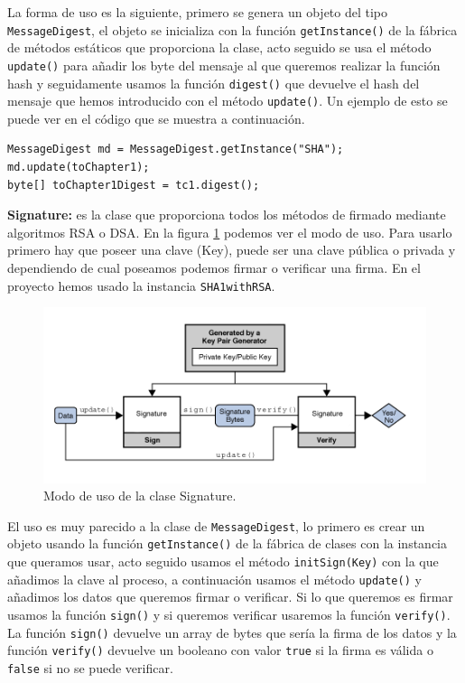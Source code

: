 La forma de uso es la siguiente, primero se genera un objeto del tipo \lstinline{MessageDigest}, el objeto se inicializa con la función \lstinline{getInstance()} de la fábrica de métodos estáticos que proporciona la clase, acto seguido se usa el método \lstinline{update()} para añadir los byte del mensaje al que queremos realizar la función hash y seguidamente usamos la función \lstinline{digest()} que devuelve el hash del mensaje que hemos introducido con el método \lstinline{update()}. Un ejemplo de esto se puede ver en el código que se muestra a continuación.

\begin{lstlisting}[style=Java] 
MessageDigest md = MessageDigest.getInstance("SHA");
md.update(toChapter1);
byte[] toChapter1Digest = tc1.digest();
\end{lstlisting}

\textbf{Signature:} es la clase que proporciona todos los métodos de firmado mediante algoritmos RSA o DSA. En la figura \ref{fig:signature} podemos ver el modo de uso. Para usarlo primero hay que poseer una clave (Key), puede ser una clave pública o privada y dependiendo de cual poseamos podemos firmar o verificar una firma. En el proyecto hemos usado la instancia \lstinline{SHA1withRSA}.

\begin{figure}[h]
  \centering
    \includegraphics[scale=0.8]{./Criptografia/imagenes/signature.png}
  \caption{Modo de uso de la clase Signature.}
  \label{fig:signature}
\end{figure} 

El uso es muy parecido a la clase de \lstinline{MessageDigest}, lo primero es crear un objeto usando la función \lstinline{getInstance()} de la fábrica de clases con la instancia que queramos usar, acto seguido usamos el método \lstinline{initSign(Key)} con la que añadimos la clave al proceso, a continuación usamos el método \lstinline{update()} y añadimos los datos que queremos firmar o verificar. Si lo que queremos es firmar usamos la función \lstinline{sign()} y si queremos verificar usaremos la función \lstinline{verify()}. La función \lstinline{sign()} devuelve un array de bytes que sería la firma de los datos y la función \lstinline{verify()} devuelve un booleano con valor \lstinline{true} si la firma es válida o \lstinline{false} si no se puede verificar.

